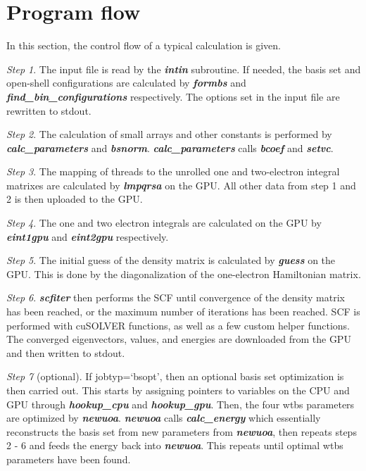 \documentclass[12pt]{report}
\begin{document}
\section{Program flow}
In this section, the control flow of a typical calculation is given.

\textit{Step 1}. The input file is read by the \textit{\textbf{intin}} subroutine. If needed, the basis set and open-shell configurations are calculated by \textit{\textbf{formbs}} and \textit{\textbf{find\_bin\_configurations}} respectively. The options set in the input file are rewritten to stdout.

\textit{Step 2}. The calculation of small arrays and other constants is performed by \textit{\textbf{calc\_parameters}} and \textit{\textbf{bsnorm}}. \textit{\textbf{calc\_parameters}} calls \textit{\textbf{bcoef}} and \textit{\textbf{setvc}}.

\textit{Step 3}. The mapping of threads to the unrolled one and two-electron integral matrixes are calculated by \textit{\textbf{lmpqrsa}} on the GPU. All other data from step 1 and 2 is then uploaded to the GPU.

\textit{Step 4}. The one and two electron integrals are calculated on the GPU by \textit{\textbf{eint1gpu}} and \textit{\textbf{eint2gpu}} respectively.

\textit{Step 5}. The initial guess of the density matrix is calculated by \textit{\textbf{guess}} on the GPU. This is done by the diagonalization of the one-electron Hamiltonian matrix.

\textit{Step 6}. \textit{\textbf{scfiter}} then performs the SCF until convergence of the density matrix has been reached, or the maximum number of iterations has been reached. SCF is performed with cuSOLVER functions, as well as a few custom helper functions. The converged eigenvectors, values, and energies are downloaded from the GPU and then written to stdout.

\textit{Step 7} (optional). If jobtyp=`bsopt', then an optional basis set optimization is then carried out. This starts by assigning pointers to variables on the CPU and GPU through \textit{\textbf{hookup\_cpu}} and \textit{\textbf{hookup\_gpu}}. Then, the four wtbs parameters are optimized by \textit{\textbf{newuoa}}. \textit{\textbf{newuoa}} calls \textit{\textbf{calc\_energy}} which essentially reconstructs the basis set from new parameters from \textit{\textbf{newuoa}}, then repeats steps 2 - 6 and feeds the energy back into \textit{\textbf{newuoa}}. This repeats until optimal wtbs parameters have been found.
\end{document}
